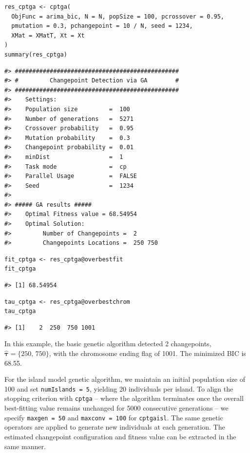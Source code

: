 \begin{verbatim}
res_cptga <- cptga(
  ObjFunc = arima_bic, N = N, popSize = 100, pcrossover = 0.95,
  pmutation = 0.3, pchangepoint = 10 / N, seed = 1234,
  XMat = XMatT, Xt = Xt
)
summary(res_cptga)
\end{verbatim}

\begin{verbatim}
#> ###############################################
#> #         Changepoint Detection via GA        #
#> ###############################################
#>    Settings: 
#>    Population size         =  100 
#>    Number of generations   =  5271 
#>    Crossover probability   =  0.95 
#>    Mutation probability    =  0.3 
#>    Changepoint probability =  0.01 
#>    minDist                 =  1 
#>    Task mode               =  cp 
#>    Parallel Usage          =  FALSE 
#>    Seed                    =  1234 
#> 
#> ##### GA results ##### 
#>    Optimal Fitness value = 68.54954 
#>    Optimal Solution: 
#>         Number of Changepoints =  2 
#>         Changepoints Locations =  250 750
\end{verbatim}

\begin{verbatim}
fit_cptga <- res_cptga@overbestfit
fit_cptga
\end{verbatim}

\begin{verbatim}
#> [1] 68.54954
\end{verbatim}

\begin{verbatim}
tau_cptga <- res_cptga@overbestchrom
tau_cptga
\end{verbatim}

\begin{verbatim}
#> [1]    2  250  750 1001
\end{verbatim}

In this example, the basic genetic algorithm detected 2 changepoints, \(\hat{\boldsymbol{\tau}} = \{\text{250, 750}\}\), with the chromosome ending flag of 1001. The minimized BIC is 68.55.

For the island model genetic algorithm, we maintain an initial population size of 100 and set \texttt{numIslands\ =\ 5}, yielding 20 individuals per island. To align the stopping criterion with \texttt{cptga} -- where the algorithm terminates once the overall best-fitting value remains unchanged for 5000 consecutive generations -- we specify \texttt{maxgen\ =\ 50} and \texttt{maxconv\ =\ 100} for \texttt{cptgaisl}. The same genetic operators are applied to generate new individuals at each generation. The estimated changepoint configuration and fitness value can be extracted in the same manner.

